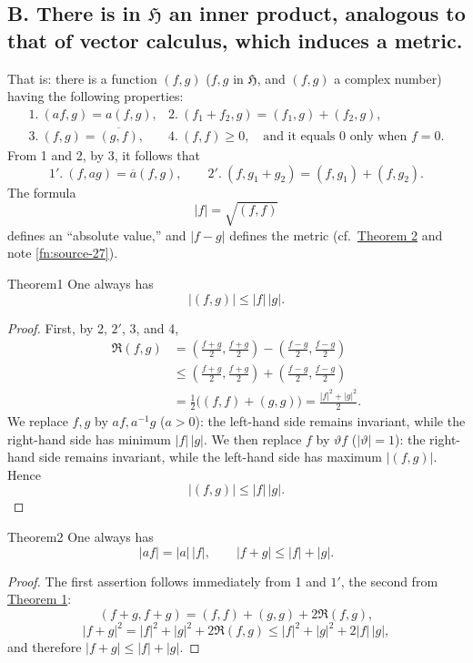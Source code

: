 ﻿\documentclass[paper=b5,fontsize=13pt,bookmarkpackage=false,twoside]{scrartcl}
\begin{document}
\subsection*{B. There is in $\mathfrak H$ an inner product, analogous to that of vector calculus, which induces a metric.}\label{axiom:B}

That is: there is a function $(f,g)$ ($f,g$ in $\mathfrak H$, and $(f,g)$ a complex number) having the following properties:
\[
\begin{array}{ll}
1.\ (af,g)=a(f,g),&
2.\ (f_1+f_2,g)=(f_1,g)+(f_2,g),\\[0.3em]
3.\ (f,g)=\overline{(g,f)},&
4.\ (f,f)\ge0,\quad\text{and it equals $0$ only when $f=0$.}
\end{array}
\]
From 1 and 2, by 3, it follows that
\[
 1'.\ (f,ag)=\overline a(f,g),
 \qquad
 2'.\ (f,g_1+g_2)=(f,g_1)+(f,g_2).
\]
The formula
\[
 |f|=\sqrt{(f,f)}
\]
defines an ``absolute value,'' and $|f-g|$ defines the metric (cf.\ \hyperref[thm:2]{Theorem 2} and note \ref{fn:source-27}).

\begin{namedstatement}{Theorem}{1}\label{thm:1}
One always has
\[
 |(f,g)|\le |f|\,|g|.
\]
\end{namedstatement}

\begin{proof}
First, by 2, $2'$, 3, and 4,
\begin{align*}
 \Re(f,g)
 &=
 \left(\frac{f+g}{2},\frac{f+g}{2}\right)
 -
 \left(\frac{f-g}{2},\frac{f-g}{2}\right)\\
 &\le
 \left(\frac{f+g}{2},\frac{f+g}{2}\right)
 +
 \left(\frac{f-g}{2},\frac{f-g}{2}\right)\\
 &=\frac12\bigl((f,f)+(g,g)\bigr)
 =\frac{|f|^2+|g|^2}{2}.
\end{align*}
We replace $f,g$ by $af,a^{-1}g$ ($a>0$): the left-hand side remains invariant, while the right-hand side has minimum $|f|\,|g|$. We then replace $f$ by $\vartheta f$ ($|\vartheta|=1$): the right-hand side remains invariant, while the left-hand side has maximum $|(f,g)|$. Hence
\[
 |(f,g)|\le |f|\,|g|.
\]
\end{proof}

\begin{namedstatement}{Theorem}{2}\label{thm:2}
One always has
\[
 |af|=|a|\,|f|,
 \qquad
 |f+g|\le|f|+|g|.
\]
\end{namedstatement}

\begin{proof}
The first assertion follows immediately from 1 and $1'$, the second from \hyperref[thm:1]{Theorem 1}:
\[
 (f+g,f+g)=(f,f)+(g,g)+2\Re(f,g),
\]
\[
 |f+g|^2
 =|f|^2+|g|^2+2\Re(f,g)
 \le |f|^2+|g|^2+2|f|\,|g|,
\]
and therefore $|f+g|\le|f|+|g|$.
\end{proof}
\end{document}
